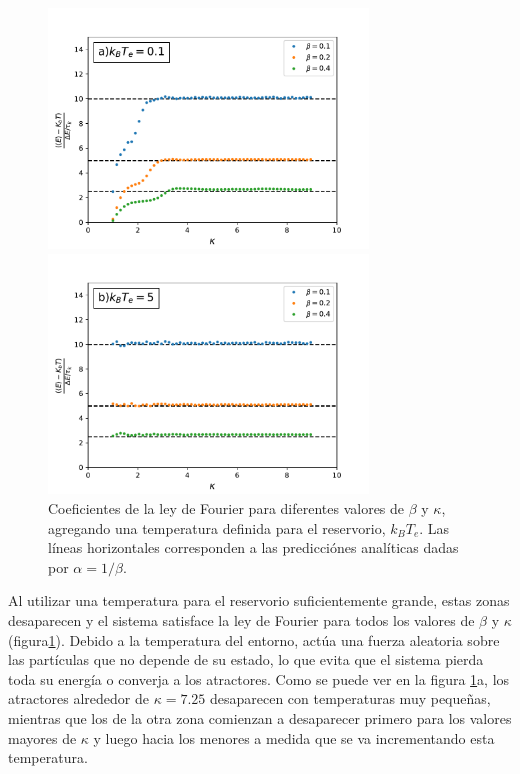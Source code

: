 \documentclass[letterpaper,12pt,oneside]{book}
\begin{document}
\begin{figure}[h!]
	\centering
	\begin{minipage}{0.45\textwidth}
		\includegraphics[width=8.5cm]{Figs/FourierCoeffsT01}
	\end{minipage}
	\begin{minipage}{0.45\textwidth}
		\includegraphics[width=8.5cm]{Figs/FourierCoeffsT5}
	\end{minipage}
	\caption{Coeficientes de la ley de Fourier para diferentes valores de $\beta$ y $\kappa$, agregando una temperatura definida para el reservorio, $k_BT_e$. Las líneas horizontales corresponden a las predicciónes analíticas dadas por $\alpha=1/\beta.$}
	\label{fig:CoeffsFourierT5}
\end{figure}

Al utilizar una temperatura para el reservorio suficientemente grande, estas zonas desaparecen y el sistema satisface la ley de Fourier para todos los valores de $\beta$ y $\kappa$ (figura\ref{fig:CoeffsFourierT5}). Debido a la temperatura del entorno, actúa una fuerza aleatoria sobre las partículas que no depende de su estado, lo que evita que el sistema pierda toda su energía o converja a los atractores. Como se puede ver en la figura \ref{fig:CoeffsFourierT5}a, los atractores alrededor de $\kappa = 7.25$ desaparecen con temperaturas muy pequeñas, mientras que los de la otra zona comienzan a desaparecer primero para los valores mayores de $\kappa$ y luego hacia los menores a medida que se va incrementando esta temperatura.
\end{document}
